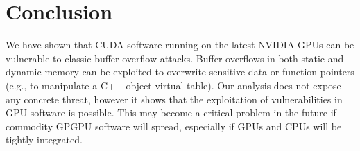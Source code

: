 \documentclass[11pt]{llncs}
\begin{document}
\section{Conclusion}
We have shown that CUDA software running on the latest NVIDIA GPUs can be vulnerable to classic buffer overflow attacks.
Buffer overflows in both static and dynamic memory can be exploited to overwrite sensitive data or function pointers (e.g., to manipulate a C++ object virtual table).
Our analysis does not expose any concrete threat, however it shows that the exploitation of vulnerabilities in GPU software is possible.
This may become a critical problem in the future if commodity GPGPU software will spread, especially if GPUs and CPUs will be tightly integrated.



\end{document}
